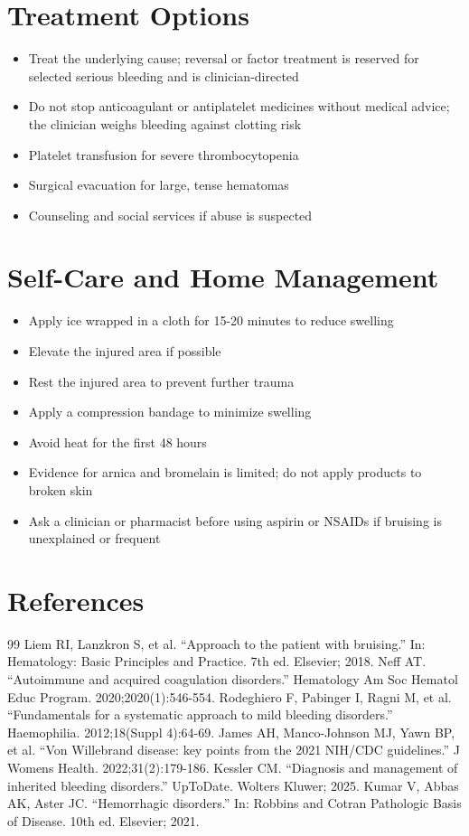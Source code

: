 \section*{Treatment Options}
\begin{itemize}
 \item Treat the underlying cause; reversal or factor treatment is reserved for selected serious bleeding and is clinician-directed
 \item Do not stop anticoagulant or antiplatelet medicines without medical advice; the clinician weighs bleeding against clotting risk
\item Platelet transfusion for severe thrombocytopenia
\item Surgical evacuation for large, tense hematomas
\item Counseling and social services if abuse is suspected
\end{itemize}

\section*{Self-Care and Home Management}
\begin{itemize}
\item Apply ice wrapped in a cloth for 15-20 minutes to reduce swelling
\item Elevate the injured area if possible
\item Rest the injured area to prevent further trauma
\item Apply a compression bandage to minimize swelling
\item Avoid heat for the first 48 hours
 \item Evidence for arnica and bromelain is limited; do not apply products to broken skin
 \item Ask a clinician or pharmacist before using aspirin or NSAIDs if bruising is unexplained or frequent
\end{itemize}

\section*{References}
\begin{thebibliography}{99}
 Liem RI, Lanzkron S, et al. ``Approach to the patient with bruising.'' In: Hematology: Basic Principles and Practice. 7th ed. Elsevier; 2018.
 Neff AT. ``Autoimmune and acquired coagulation disorders.'' Hematology Am Soc Hematol Educ Program. 2020;2020(1):546-554.
 Rodeghiero F, Pabinger I, Ragni M, et al. ``Fundamentals for a systematic approach to mild bleeding disorders.'' Haemophilia. 2012;18(Suppl 4):64-69.
 James AH, Manco-Johnson MJ, Yawn BP, et al. ``Von Willebrand disease: key points from the 2021 NIH/CDC guidelines.'' J Womens Health. 2022;31(2):179-186.
 Kessler CM. ``Diagnosis and management of inherited bleeding disorders.'' UpToDate. Wolters Kluwer; 2025.
 Kumar V, Abbas AK, Aster JC. ``Hemorrhagic disorders.'' In: Robbins and Cotran Pathologic Basis of Disease. 10th ed. Elsevier; 2021.
\end{thebibliography}
